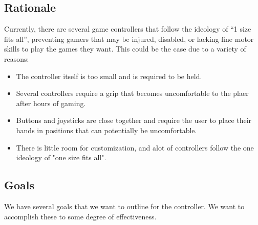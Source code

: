 \documentclass[a4]{article}
\begin{document}
\subsection{Rationale}
Currently, there are several game controllers that follow the ideology of “1 size fits all”, preventing gamers that may be injured, disabled, or lacking fine motor 
skills to play the games they want. This could be the case due to a variety of reasons:
\begin{itemize}
    \item The controller itself is too small and is required to be held.
    \item Several controllers require a grip that becomes uncomfortable to the plaer after hours of gaming.
    \item Buttons and joysticks are close together and require the user to place their hands in positions that can potentially be uncomfortable.
    \item There is little room for customization, and alot of controllers follow the one ideology of "one size fits all".  
\end{itemize}

\subsection{Goals}
We have several goals that we want to outline for the controller. We want to accomplish these to some degree of effectiveness.
\end{document}
